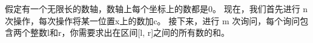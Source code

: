 假定有一个无限长的数轴，数轴上每个坐标上的数都是0。
现在，我们首先进行 n 次操作，每次操作将某一位置x上的数加c。
接下来，进行 m 次询问，每个询问包含两个整数l和r，你需要求出在区间[l, r]之间的所有数的和。